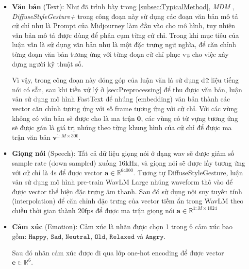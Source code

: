 \begin{itemize}
	\item \textbf{Văn bản} (Text):
		Như đã trình bày trong \autoref{subsec:TypicalMethod}, \textit{MDM} \cite{tevet2022human}, \textit{DiffuseStyleGesture+} \cite{yang2022DiffuseStyleGestureplus} trong công đoạn này sử dụng các đoạn văn bản mô tả cử chỉ như là Prompt của Midjourney làm đầu vào cho mô hình, tuy nhiên văn bản mô tả được dùng để phân cụm từng cử chỉ. Trong khi mục tiêu của luận văn là sử dụng văn bản như là một đặc trưng ngữ nghĩa, để căn chỉnh từng đoạn văn bản tương ứng với  từng đoạn cử chỉ phục vụ cho việc xây dựng người kỹ thuật số.
		
		Vì vậy, trong công đoạn này đóng góp của luận văn là sử dụng dữ liệu tiếng nói có sẵn, sau khi tiền xử lý ở \autoref{sec:Preprocessing} để thu được văn bản,  luận văn sử dụng mô hình FastText  \cite{bojanowski2017enriching} để nhúng (embedding) văn bản thành các vector căn chỉnh tương ứng với số frame tương ứng với cử chỉ. Với các vùng không có văn bản sẽ được cho là ma trận $\mathbf{0}$, các vùng có từ vựng tương ứng sẽ được gán là giá trị nhúng  theo từng khung hình của cử chỉ để được ma trận văn bản $\mathbf{v}^{1:M \times 300}$.
		
		\item \textbf{Giọng nói} (Speech): Tất cả dữ liệu giọng nói ở dạng wav sẽ được giảm số sample rate (down sampled) xuống $16 \mathrm{kHz}$, và giọng nói sẽ được lấy tương ứng với cử chỉ là 4s để được vector $\mathbf{a} \in \mathbb{R}^{64000}$. Tương tự DiffuseStyleGesture, luận văn sử dụng mô hình pre-train WavLM Large \cite{Chen_2022} nhúng waveform thô vào để được vector thể hiện đặc trưng âm thanh. Sau đó sử dụng nội suy tuyến tính (interpolation) để căn chỉnh đặc trưng của vector tiềm ẩn trong WavLM theo chiều thời gian thành $20 \text{fps}$ để được ma trận giọng nói $\mathbf{a} \in \mathbb{R}^{1:M \times 1024}$
		
		\item \textbf{Cảm xúc} (Emotion): Cảm xúc là nhãn được chọn 1 trong 6 cảm xúc bao gồm: $\texttt{Happy}$, $\texttt{Sad}$, $\texttt{Neutral}$, $\texttt{Old}$, $\texttt{Relaxed}$ và $\texttt{Angry}$. 
		
		Sau đó nhãn cảm xúc được đi qua lớp one-hot encoding để được vector  $\mathbf{e} \in \mathbb{R}^{6}$.
		
		
		

\end{itemize}
